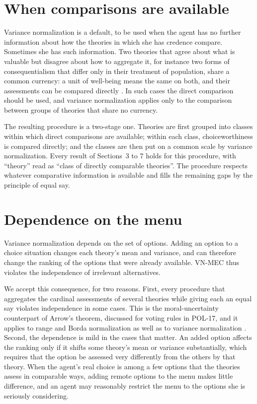 \documentclass{situationist-preprint}
\begin{document}
\section{When comparisons are available}

Variance normalization is a default, to be used when the agent has no further information about how the theories in which she has credence compare. Sometimes she has such information. Two theories that agree about what is valuable but disagree about how to aggregate it, for instance two forms of consequentialism that differ only in their treatment of population, share a common currency: a unit of well-being means the same on both, and their assessments can be compared directly \citep{Tarsney2018}. In such cases the direct comparison should be used, and variance normalization applies only to the comparison between groups of theories that share no currency.

The resulting procedure is a two-stage one. Theories are first grouped into classes within which direct comparisons are available; within each class, choiceworthiness is compared directly; and the classes are then put on a common scale by variance normalization. Every result of Sections~3 to 7 holds for this procedure, with \enquote{theory} read as \enquote{class of directly comparable theories}. The procedure respects whatever comparative information is available and fills the remaining gaps by the principle of equal say.

\section{Dependence on the menu}

Variance normalization depends on the set of options. Adding an option to a choice situation changes each theory's mean and variance, and can therefore change the ranking of the options that were already available. VN-MEC thus violates the independence of irrelevant alternatives.

We accept this consequence, for two reasons. First, every procedure that aggregates the cardinal assessments of several theories while giving each an equal say violates independence in some cases. This is the moral-uncertainty counterpart of Arrow's theorem, discussed for voting rules in POL-17, and it applies to range and Borda normalization as well as to variance normalization \citep{MacAskill2016}. Second, the dependence is mild in the cases that matter. An added option affects the ranking only if it shifts some theory's mean or variance substantially, which requires that the option be assessed very differently from the others by that theory. When the agent's real choice is among a few options that the theories assess in comparable ways, adding remote options to the menu makes little difference, and an agent may reasonably restrict the menu to the options she is seriously considering.
\end{document}
